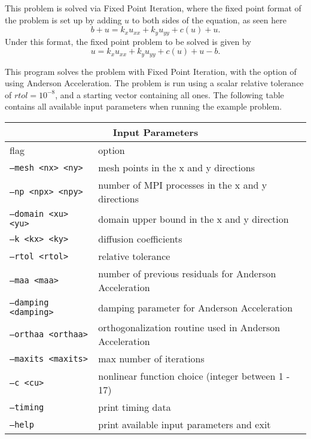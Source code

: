 This problem is solved via Fixed Point Iteration, where the fixed point format
of the problem is set up by adding $u$ to both sides of the equation, as
seen here
\begin{equation}
    b + u = k_x u_{xx} + k_y u_{yy} + c(u) + u.
\end{equation}
Under this format, the fixed point problem to be solved is given by
\begin{equation}
    u = k_x u_{xx} + k_y u_{yy} + c(u) + u - b.
\end{equation}

This program solves the problem with Fixed Point Iteration, 
with the option of using Anderson Acceleration.
The problem is run using a scalar relative
tolerance of $rtol=10^{-8}$, and a starting vector
containing all ones. 
The following table contains all available input parameters
when running the example problem.

\begin{center}
\begin{tabular}{ |p{5cm}||p{10cm}| }
\hline
\multicolumn{2}{|c|}{Input Parameters} \\
\hline
flag & option \\
\hline
{\tt --mesh <nx> <ny>} & mesh points in the x and y directions\\
{\tt --np <npx> <npy>} & number of MPI processes in the x and y directions\\
{\tt --domain <xu> <yu>} & domain upper bound in the x and y direction\\
{\tt --k <kx> <ky>} & diffusion coefficients\\
{\tt --rtol <rtol>} & relative tolerance\\
{\tt --maa <maa>} & number of previous residuals for Anderson Acceleration \\
{\tt --damping <damping>} & damping parameter for Anderson Acceleration \\
{\tt --orthaa <orthaa>} & orthogonalization routine used in Anderson Acceleration \\
{\tt --maxits <maxits>} & max number of iterations \\
{\tt --c <cu>} & nonlinear function choice (integer between 1 - 17)\\
{\tt --timing} & print timing data\\
{\tt --help} & print available input parameters and exit\\
\hline
\end{tabular}
\end{center}


